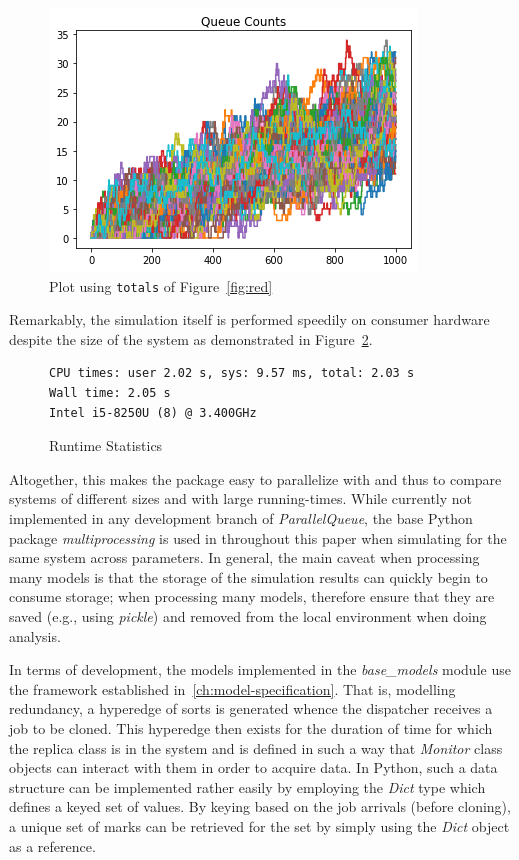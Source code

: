 \begin{figure}
    \centering
    \includegraphics[scale=0.8]{redundancy}
    \caption{Plot using \lstinline{totals} of Figure~\ref{fig:red}}
    \label{fig:redpic}
\end{figure}

Remarkably, the simulation itself is performed speedily on consumer hardware despite the size of the system as demonstrated in Figure~\ref{fig:lstlisting2}.
\begin{figure}
    \begin{lstlisting}
CPU times: user 2.02 s, sys: 9.57 ms, total: 2.03 s
Wall time: 2.05 s
Intel i5-8250U (8) @ 3.400GHz
    \end{lstlisting}
    \centering
    \caption{Runtime Statistics}
    \label{fig:lstlisting2}
\end{figure}


Altogether, this makes the package easy to parallelize with and thus to compare systems of different sizes
and with large running-times.
While currently not implemented in any development branch of \textit{ParallelQueue}, the base Python package
\textit{multiprocessing} is used in throughout this paper when simulating for the same system across parameters.
In general, the main caveat when processing many models is that the storage of the simulation results can quickly begin
to consume storage;
when processing many models, therefore ensure that they are saved (e.g., using \textit{pickle}) and removed from
the local environment when doing analysis.

In terms of development, the models implemented in the \textit{base\_models} module use the framework established in~\ref{ch:model-specification}.
That is, modelling redundancy, a hyperedge of sorts is generated whence the dispatcher
receives a job to be cloned.
This hyperedge then exists for the duration of time for which the replica class is in the system and is defined in such
a way that \textit{Monitor} class objects can interact with them in order to acquire data.
In Python, such a data structure can be implemented rather easily by employing the \textit{Dict} type which defines
a keyed set of values.
By keying based on the job arrivals (before cloning), a unique set of marks can be retrieved for the set by simply using
the \textit{Dict} object as a reference.

